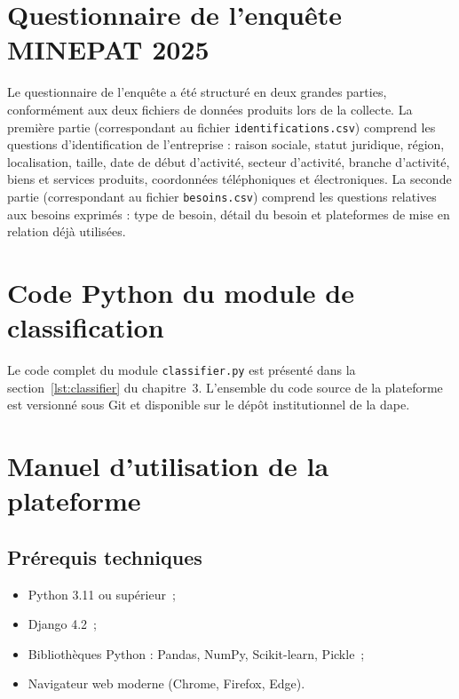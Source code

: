 \documentclass[12pt, a4paper, oneside]{report}
\begin{document}
\printbibliography[heading=bibintoc, title={Bibliographie}]

\appendix

\chapter{Questionnaire de l'enquête MINEPAT 2025}
\label{ann:questionnaire}

Le questionnaire de l'enquête a été structuré en deux grandes parties, conformément aux deux fichiers de données produits lors de la collecte. La première partie (correspondant au fichier \texttt{identifications.csv}) comprend les questions d'identification de l'entreprise : raison sociale, statut juridique, région, localisation, taille, date de début d'activité, secteur d'activité, branche d'activité, biens et services produits, coordonnées téléphoniques et électroniques. La seconde partie (correspondant au fichier \texttt{besoins.csv}) comprend les questions relatives aux besoins exprimés : type de besoin, détail du besoin et plateformes de mise en relation déjà utilisées.

\chapter{Code Python du module de classification}
\label{ann:code}

Le code complet du module \texttt{classifier.py} est présenté dans la section~\ref{lst:classifier} du chapitre~3. L'ensemble du code source de la plateforme est versionné sous Git et disponible sur le dépôt institutionnel de la \gls{dape}.

\chapter{Manuel d'utilisation de la plateforme}
\label{ann:manuel}

\section*{Prérequis techniques}

\begin{itemize}
  \item Python 3.11 ou supérieur~;
  \item Django 4.2~;
  \item Bibliothèques Python : Pandas, NumPy, Scikit-learn, Pickle~;
  \item Navigateur web moderne (Chrome, Firefox, Edge).
\end{itemize}
\end{document}
